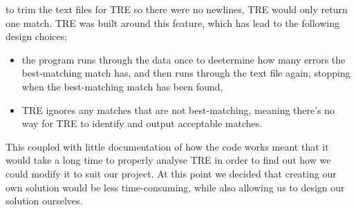 to trim the text files for TRE so there were no newlines, TRE would only 
return one match. TRE was built around this feature, which has lead to the following 
design choices;
\begin{itemize}
\item the program runs through the data once to deetermine how many errors the 
best-matching match has, and then runs through the text file again, stopping 
when the best-matching match has been found, 
\item TRE ignores any matches that are not best-matching, meaning there's 
no way for TRE to identify and output acceptable matches.
\end{itemize}
This coupled with little documentation of how the code works meant that it would 
take a long time to properly analyse TRE in order to find out how we could 
modify it to suit our project. At this point we decided that creating our 
own solution would be less time-consuming, while also allowing us to design our 
solution ourselves.
